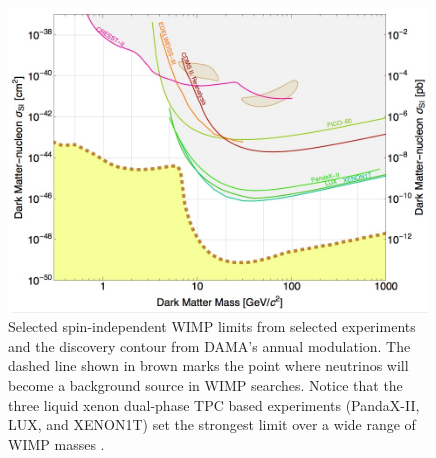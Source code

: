 \begin{figure}[t]
	\centering
	\includegraphics[width=0.99\textwidth]{dm_si_limits}
	\caption{Selected spin-independent WIMP limits from selected experiments and the discovery contour from DAMA's annual modulation.  The dashed line shown in brown marks the point where neutrinos will become a background source in WIMP searches.  Notice that the three liquid xenon dual-phase TPC based experiments (PandaX-II, LUX, and XENON1T) set the strongest limit over a wide range of WIMP masses \cite{agnese2015improved, armengaud2016constraints, savage2009compatibility, amole2017dark, tan2016dark, akerib2017results, aprile2017first, angloher2016results, ruppin2014complementarity}.}
	\label{fig:dm_si_limits}
\end{figure}




